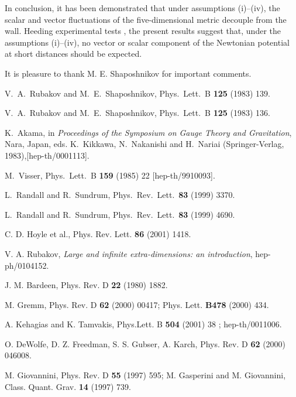\documentclass[a4paper,12pt]{article}
\begin{document}
In conclusion, it has been demonstrated that under 
assumptions (i)--(iv), the scalar and vector fluctuations
 of the five-dimensional metric decouple from the wall. 
 Heeding experimental tests \cite{exp}, 
the present results suggest that, under the 
assumptions (i)--(iv), no vector or scalar component of the Newtonian 
potential at short distances should be expected.

It is pleasure to thank M. E. Shaposhnikov for important comments.
\begin{thebibliography}{99}
V.~A.~Rubakov and M.~E.~Shaposhnikov,
Phys.\ Lett.\ B {\bf 125} (1983) 139.

V.~A.~Rubakov and M.~E.~Shaposhnikov,
Phys.\ Lett.\  B {\bf 125} (1983) 136.

K.~Akama, in {\it Proceedings of the Symposium on Gauge 
Theory and Gravitation}, 
Nara, Japan, eds. K.~Kikkawa, N.~Nakanishi and H.~Nariai (Springer-Verlag, 
1983),[hep-th/0001113].

M.~Visser,
Phys.\ Lett.\  B {\bf 159} (1985) 22
[hep-th/9910093].

 L.~Randall and R.~Sundrum,
Phys.\ Rev.\ Lett.\  {\bf 83} (1999) 3370.

L.~Randall and R.~Sundrum,
Phys.\ Rev.\ Lett.\  {\bf 83} (1999) 4690.

  C. D. Hoyle et al., Phys. Rev. Lett. {\bf 86} (2001) 1418.

 V. A. Rubakov, {\em Large and infinite extra-dimensions: 
an introduction}, hep-ph/0104152.

 J. M. Bardeen, Phys. Rev. D {\bf 22} (1980) 1882.

 M. Gremm,  Phys. Rev. D {\bf 62} (2000) 00417;
Phys. Lett. {\bf B478}  (2000) 434.

 A. Kehagias and K. Tamvakis, Phys.Lett. B {\bf 504} (2001) 38
; hep-th/0011006.

 O. DeWolfe, D. Z. Freedman, S. S. Gubser, A. Karch, Phys. 
Rev. D {\bf 62} (2000) 046008.

 M. Giovannini, Phys. Rev. D {\bf 55} (1997) 595; 
M. Gasperini and M. Giovannini, Class. Quant. Grav. {\bf 14} (1997) 739.

\end{thebibliography}
\end{document}
